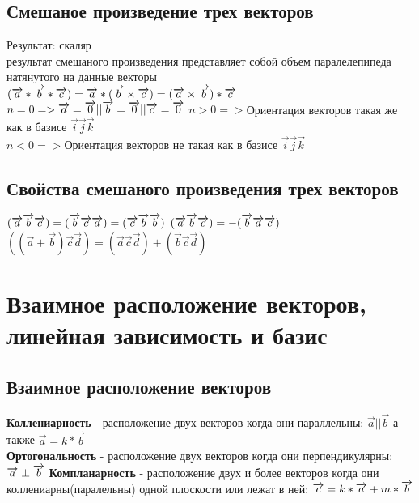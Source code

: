 \documentclass{book}
\begin{document}
\subsection{Смешаное произведение трех векторов}
Результат: скаляр\\
результат смешаного произведения представляет собой объем паралелепипеда натянутого на данные векторы\\ 
$(\overrightarrow{a}*\overrightarrow{b}*\overrightarrow{c})=\overrightarrow{a}*(\overrightarrow{b}\times\overrightarrow{c})=(\overrightarrow{a}\times\overrightarrow{b})*\overrightarrow{c}\\$
$n=0 => \overrightarrow{a}=\overrightarrow{0}||\overrightarrow{b}=\overrightarrow{0}||\overrightarrow{c}=\overrightarrow{0}\\$
$n>0 => $Ориентация векторов такая же как в базисе $\overrightarrow{i}\overrightarrow{j}\overrightarrow{k}$\\
$n<0 => $Ориентация векторов не такая как в базисе $\overrightarrow{i}\overrightarrow{j}\overrightarrow{k}$\\
\subsection{Свойства смешаного произведения трех векторов}
$(\overrightarrow{a}\overrightarrow{b}\overrightarrow{c})=(\overrightarrow{b}\overrightarrow{c}\overrightarrow{a})=(\overrightarrow{c}\overrightarrow{b}\overrightarrow{b})\\$
$(\overrightarrow{a}\overrightarrow{b}\overrightarrow{c})=-(\overrightarrow{b}\overrightarrow{a}\overrightarrow{c})\\$
$((\overrightarrow{a}+\overrightarrow{b})\overrightarrow{c}\overrightarrow{d})=(\overrightarrow{a}\overrightarrow{c}\overrightarrow{d})+(\overrightarrow{b}\overrightarrow{c}\overrightarrow{d})$
\section{Взаимное расположение векторов, линейная зависимость и базис}
\subsection{Взаимное расположение векторов}
\textbf{Коллениарность} - расположение двух векторов когда они параллельны: $\overrightarrow{a}||\overrightarrow{b}$ а также $\overrightarrow{a}=k*\overrightarrow{b}$\\
\textbf{Ортогональность} - расположение двух векторов когда они перпендикулярны: $\overrightarrow{a}\perp\overrightarrow{b}\\$
\textbf{Компланарность} - расположение двух и более векторов когда они коллениарны(паралельны) одной плоскости или лежат в ней: $\overrightarrow{c}=k*\overrightarrow{a}+m*\overrightarrow{b}\\$
\end{document}
